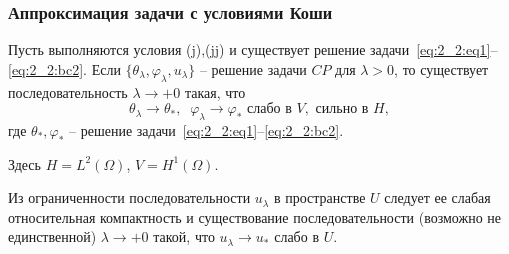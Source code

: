 \begin{frame}
    \frametitle{Аппроксимация задачи с условиями Коши}
    \begin{theorem}[2.5]
        \label{th:2_2:3}
        Пусть выполняются условия (j),(jj) и существует решение
        задачи~\eqref{eq:2_2:eq1}--\eqref{eq:2_2:bc2}.
        Если $\{\theta_\lambda,\varphi_\lambda,u_\lambda\}$ -- решение
        задачи $CP$ для $\lambda>0$, то существует последовательность $\lambda\to +0$
        такая, что
        \[
            \theta_\lambda\rightarrow\theta_*, \;\; \varphi_\lambda\rightarrow\varphi_*
            \text{ слабо в }V,\text{ сильно в }H,
        \]
        где $\theta_*,\varphi_*$ -- решение задачи~\eqref{eq:2_2:eq1}--\eqref{eq:2_2:bc2}.
    \end{theorem}
    Здесь $H = L^2(\Omega)$, $V = H^1(\Omega)$.

    \vspace{10mm}
    Из ограниченности последовательности $u_\lambda$
    в пространстве $U$ следует
    ее слабая относительная компактность и существование последовательности
    (возможно не единственной) $\lambda\to+0$ такой, что
    $u_\lambda \rightarrow u_*$ слабо в $U$.

\end{frame}

